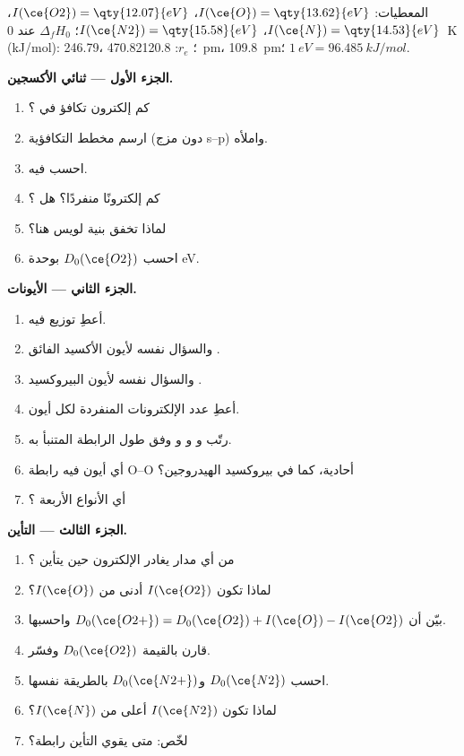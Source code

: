 \begin{problem}
\label{pb:b2:diatomic-mos:1}
المعطيات: $I(\ce{O}) = \qty{13.62}{eV}$، $I(\ce{O2}) = \qty{12.07}{eV}$، $I(\ce{N}) =
\qty{14.53}{eV}$، $I(\ce{N2}) = \qty{15.58}{eV}$؛ $\Delta_f H_0$ عند \qty{0}{K}
(\unit{kJ/mol}):  246.79،  470.82؛ $r_e$:  \qty{120.8}{pm}، 
\qty{109.8}{pm}؛ $1\ \unit{eV} = \qty{96.485}{kJ/mol}$.

\medskip
\noindent\textbf{الجزء الأول --- ثنائي الأكسجين.}
\begin{enumerate}
  \item كم إلكترون تكافؤ في ؟
  \item ارسم مخطط  التكافؤية (دون مزج s--p) واملأه.
  \item احسب  فيه.
  \item كم إلكترونًا منفردًا؟ هل  ؟
  \item لماذا تخفق بنية لويس هنا؟
  \item احسب $D_0(\ce{O2})$ بوحدة \unit{eV}.
\end{enumerate}

\medskip
\noindent\textbf{الجزء الثاني --- الأيونات.}
\begin{enumerate}[resume]
  \item أعطِ توزيع   فيه.
  \item والسؤال نفسه لأيون الأكسيد الفائق .
  \item والسؤال نفسه لأيون البيروكسيد .
  \item أعطِ عدد الإلكترونات المنفردة لكل أيون.
  \item رتّب  و و و وفق طول الرابطة المتنبأ به.
  \item أي أيون فيه رابطة O--O أحادية، كما في بيروكسيد الهيدروجين؟
  \item أي الأنواع الأربعة ؟
\end{enumerate}

\medskip
\noindent\textbf{الجزء الثالث --- التأين.}
\begin{enumerate}[resume]
  \item من أي مدار يغادر الإلكترون حين يتأين ؟
  \item لماذا تكون $I(\ce{O2})$ أدنى من $I(\ce{O})$؟
  \item بيّن أن $D_0(\ce{O2+}) = D_0(\ce{O2}) + I(\ce{O}) - I(\ce{O2})$ واحسبها.
  \item قارن بالقيمة $D_0(\ce{O2})$ وفسّر.
  \item احسب $D_0(\ce{N2})$ و$D_0(\ce{N2+})$ بالطريقة نفسها.
  \item لماذا تكون $I(\ce{N2})$ أعلى من $I(\ce{N})$؟
  \item لخّص: متى يقوي التأين رابطة؟
\end{enumerate}


\end{problem}
